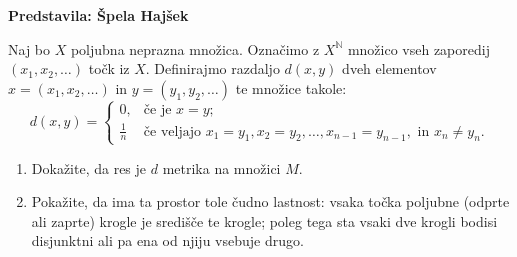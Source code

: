 \textbf{Predstavila: Špela Hajšek}

Naj bo $X$ poljubna neprazna množica. Označimo z $X^{\mathbb{N}}$ množico vseh zaporedij  $(x_{1}, x_{2}, \dots)$ točk iz $X$. Definirajmo razdaljo $d(x,y)$ dveh elementov $x=(x_{1}, x_{2}, \dots)$ in $y=(y_{1}, y_{2}, \dots)$ te množice takole: \[d(x,y) = \begin{cases} 0, & \text{če je } x=y;  \\ \frac{1}{n} & \text{če veljajo } x_{1}=y_{1}, x_{2}= y_{2}, \dots, x_{n-1} = y_{n-1}, \text{ in } x_{n} \neq y_{n}. \end{cases}\]
\begin{enumerate}
	\item Dokažite, da res je $d$ metrika na množici $M$.
	\item Pokažite, da ima ta prostor tole čudno lastnost: vsaka točka poljubne (odprte ali zaprte) krogle je središče te krogle; poleg tega sta vsaki dve krogli bodisi disjunktni ali pa ena od njiju vsebuje drugo.
\end{enumerate}